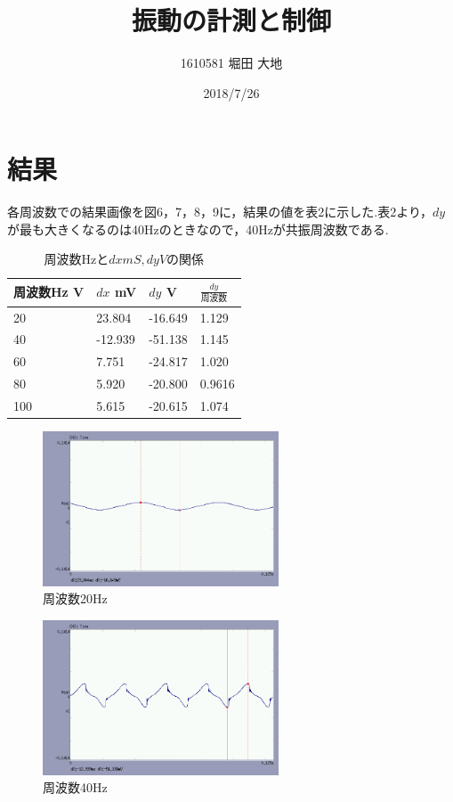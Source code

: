 \documentclass[twocolumn, 10pt,a4j]{jsarticle}
\title{\vspace{-2.5cm}振動の計測と制御}
\author{1610581 堀田 大地}
\date{2018/7/26}
\begin{document}
  \maketitle{}
  \section{結果}
    各周波数での結果画像を図6，7，8，9に，結果の値を表2に示した.表2より，$dy$が最も大きくなるのは40Hzのときなので，40Hzが共振周波数である.
    \begin{table}[]
      \centering
        \caption{周波数Hzと$dx mS, dy V$の関係}
        \label{my-label}
        \footnotesize
        \begin{tabular}{llll}
          周波数Hz V & $dx$ mV & $dy$ V & $\frac{dy}{周波数}$  \\ \hline
          20 & 23.804 & -16.649 & 1.129 \\
          40 & -12.939 & -51.138 & 1.145 \\
          60 & 7.751 & -24.817 & 1.020 \\
          80 & 5.920 & -20.800 & 0.9616 \\
          100 & 5.615 & -20.615 & 1.074 \\
        \end{tabular}
      \end{table}

    \begin{figure}[H]
      \begin{center}
        \includegraphics[width=7cm]{../img/experiments/006.png}
        \caption{周波数20Hz}
      \end{center}
    \end{figure}

    \begin{figure}[H]
      \begin{center}
        \includegraphics[width=7cm]{../img/experiments/007.png}
        \caption{周波数40Hz}
      \end{center}
    \end{figure}
\end{document}
